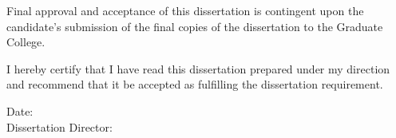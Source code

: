 \documentclass[
12pt, %
english, %
doublespacing, %
nolistspacing, %
liststotoc, %
headsepline, %
chapterinoneline, %
openany, %
]{DoctoralThesis}\usepackage[]{graphicx}\usepackage[]{color}
\begin{document}
\begin{singlespacing}
\noindent Final approval and acceptance of this dissertation is contingent upon the candidate's submission of the final copies of the dissertation to the Graduate College.

\vspace*{0.2in}

\noindent I hereby certify that I have read this dissertation prepared under my direction and recommend that it be accepted as fulfilling the dissertation requirement.
\vspace*{0.5in}

\noindent\underline{\makebox[4.0in][r]{}} \hspace{0.4in} Date:  \\
Dissertation Director: \chairname \\
\vfill
\end{singlespacing}%



%



\end{document}
